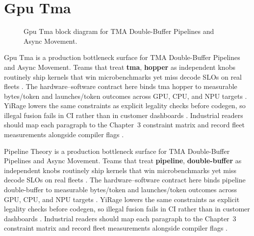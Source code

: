 \section{Gpu Tma}
\label{sec:gpu_tma}
\begin{figure}[t]
\centering
{}
\caption{Gpu Tma block diagram for TMA Double-Buffer Pipelines and Async Movement.}
\label{fig:gpu_tma_architecture}
\end{figure}


Gpu Tma is a production bottleneck surface for TMA Double-Buffer Pipelines and Async Movement. Teams that treat \textbf{tma}, \textbf{hopper} as independent knobs routinely ship kernels that win microbenchmarks yet miss decode SLOs on real fleets \citep{taxbreak2026,semianalysis2024tma}. The hardware--software contract here binds tma hopper to measurable bytes/token and launches/token outcomes across GPU, CPU, and NPU targets \citep{memoryfloor2026,amd2024xdna}. YiRage lowers the same constraints as explicit legality checks before codegen, so illegal fusion fails in CI rather than in customer dashboards \citep{nvidia2022hopper,amd2024aie}. Industrial readers should map each paragraph to the Chapter~3 constraint matrix and record fleet measurements alongside compiler flags \citep{semianalysis2024tma,dlbook}.

Pipeline Theory is a production bottleneck surface for TMA Double-Buffer Pipelines and Async Movement. Teams that treat \textbf{pipeline}, \textbf{double-buffer} as independent knobs routinely ship kernels that win microbenchmarks yet miss decode SLOs on real fleets \citep{liu2024deepseekv3,memoryfloor2026}. The hardware--software contract here binds pipeline double-buffer to measurable bytes/token and launches/token outcomes across GPU, CPU, and NPU targets \citep{patel2025llminference,nvidia2022hopper}. YiRage lowers the same constraints as explicit legality checks before codegen, so illegal fusion fails in CI rather than in customer dashboards \citep{taxbreak2026,semianalysis2024tma}. Industrial readers should map each paragraph to the Chapter~3 constraint matrix and record fleet measurements alongside compiler flags \citep{memoryfloor2026,amd2024xdna}.

